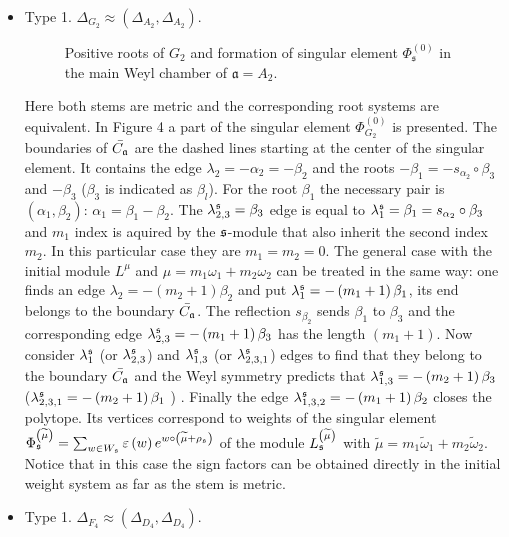 \begin{itemize}
\item
Type 1. $\Delta _{G_{2}}\approx (\Delta _{A_{2}},\Delta
_{A_{2}}).$

 \begin{figure}[h!bt]
  \noindent{}
  \caption{Positive roots of $G_{2}$ and formation of singular element $\Phi^{(0)}_{\mathfrak{s}}$ in the main Weyl chamber of $\mathfrak{a}=A_{2}$.}
\end{figure}
Here both stems are metric and the corresponding root systems are
equivalent. In Figure 4 a part of the singular element $\Phi
_{G_{2}}^{\left( 0\right) }$ is presented. The boundaries of $\bar{C_{\frak{a%
}}}$ are the dashed lines starting at the center of the singular
element. It
contains the edge $\lambda _{2}=-\alpha _{2}=-\beta _{2}$ and the roots $%
-\beta _{1}=-s_{\alpha _{2}}\circ \beta _{3}$ and $ -\beta _{3}$
($\beta _{3}$ is indicated as $\beta _{l}$). For the root $\beta
_{1}$ the necessary pair
is  $(\alpha _{1}, \beta _{2})$: $\alpha _{1}=\beta _{1}-\beta _{2}$. The $%
\lambda _{2,3}^{\frak{s}}=\beta _{3}$ edge is equal to $\lambda _{1}^{\frak{s%
}}=\beta _{1}=s_{\alpha _{2}}\circ \beta _{3}$ and $m_{1}$ index
is aquired by the $\frak{s}$-module that also inherit the second
index $m_{2}$. In this particular
case they are $m_{1}=m_{2}=0$. The general case with the initial module $%
L^{\mu }$ and $\mu =m_{1}\omega _{1}+m_{2}\omega _{2}$ can be
treated in the same way: one finds an edge $\lambda _{2}=-\left(
m_{2}+1\right) \beta _{2}$ and put $\lambda
_{1}^{\frak{s}}=-\left( m_{1}+1\right) \beta _{1}$, its end
belongs to the boundary $\bar{C_{\frak{a}}}$. The reflection
$s_{\beta
_{2}} $ sends $\beta _{1}$ to $\beta _{3}$ and the corresponding edge 
$\lambda _{2,3}^{\frak{s}}=-\left( m_{1}+1\right) \beta _{3}$ has
the length $\left( m_{1}+1\right) $. Now consider $\lambda _{1}^{\frak{s}}$ (or
$\lambda _{2,3}^{\frak{s}} $) and $\lambda _{1,3}^{\frak{s}}$ (or
$\lambda _{2,3,1}^{\frak{s}}$) edges to find that they belong to
the boundary $\bar{C_{\frak{a}}}$ and the Weyl symmetry predicts
that $\lambda _{1,3}^{\frak{s}}=-\left( m_{2}+1\right)
\beta _{3}$ ($\lambda _{2,3,1}^{\frak{s}}=-\left( m_{2}+1\right) \beta _{1}$%
) . Finally the edge $\lambda _{1,3,2}^{\frak{s}}=-\left(
m_{1}+1\right) \beta _{2}$ closes the polytope. Its vertices
correspond to weights of the singular
element $\Phi _{\frak{s}}^{\left( \widetilde{\mu }\right) }=\sum_{w\in W_{%
\frak{s}}}\varepsilon \left( w\right) e^{w\circ \left(
\widetilde{\mu }+\rho
_{\frak{s}}\right) }$ of the module $L_{\frak{s}}^{\left( \widetilde{\mu }%
\right) }$ with $\widetilde{\mu }=m_{1}\widetilde{\omega }_{1}+m_{2}%
\widetilde{\omega }_{2}$. Notice that in this case the sign
factors can be obtained directly in the initial weight system as
far as the stem is metric.
\item
Type 1. $\Delta _{F_{4}}\approx (\Delta _{D_{4}},\Delta
_{D_{4}}).$


\end{itemize}
